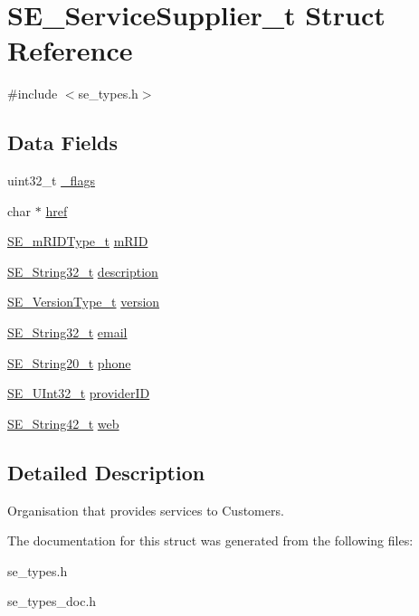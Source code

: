 \hypertarget{structSE__ServiceSupplier__t}{}\section{S\+E\+\_\+\+Service\+Supplier\+\_\+t Struct Reference}
\label{structSE__ServiceSupplier__t}


{\ttfamily \#include $<$se\+\_\+types.\+h$>$}

\subsection*{Data Fields}
\begin{DoxyCompactItemize}
\item 
uint32\+\_\+t \hyperlink{group__ServiceSupplier_ga41efbca82458bf466f86bba6e0781fee}{\+\_\+flags}
\item 
char $\ast$ \hyperlink{group__ServiceSupplier_gad5b711de34ee477aaa2daddc4577bfeb}{href}
\item 
\hyperlink{group__mRIDType_gac74622112f3a388a2851b2289963ba5e}{S\+E\+\_\+m\+R\+I\+D\+Type\+\_\+t} \hyperlink{group__ServiceSupplier_ga1b4fcb150a9e4ac2bf15c73fb0195c14}{m\+R\+ID}
\item 
\hyperlink{group__String32_gac9f59b06b168b4d2e0d45ed41699af42}{S\+E\+\_\+\+String32\+\_\+t} \hyperlink{group__ServiceSupplier_ga8f0635af29f2fcd2e10874b7fa194bb3}{description}
\item 
\hyperlink{group__VersionType_ga4b8d27838226948397ed99f67d46e2ae}{S\+E\+\_\+\+Version\+Type\+\_\+t} \hyperlink{group__ServiceSupplier_gaf772e85b2c6f57fa9adba209a9b6b998}{version}
\item 
\hyperlink{group__String32_gac9f59b06b168b4d2e0d45ed41699af42}{S\+E\+\_\+\+String32\+\_\+t} \hyperlink{group__ServiceSupplier_gaba52040aa146ecd82d50a3deb2d98c19}{email}
\item 
\hyperlink{group__String20_gac62354528eb48096f8deab6e503a3193}{S\+E\+\_\+\+String20\+\_\+t} \hyperlink{group__ServiceSupplier_ga182c6fbb5b90206fad482369e835961c}{phone}
\item 
\hyperlink{group__UInt32_ga70bd4ecda3c0c85d20779d685a270cdb}{S\+E\+\_\+\+U\+Int32\+\_\+t} \hyperlink{group__ServiceSupplier_ga0fbfa3eb24a6d2d0a652f44524327618}{provider\+ID}
\item 
\hyperlink{group__String42_gad5a294b994fa3a024ca6d747f784f0d9}{S\+E\+\_\+\+String42\+\_\+t} \hyperlink{group__ServiceSupplier_gae334c85b63bc5c156ed70d2d7359b0f0}{web}
\end{DoxyCompactItemize}


\subsection{Detailed Description}
Organisation that provides services to Customers. 

The documentation for this struct was generated from the following files\+:\begin{DoxyCompactItemize}
\item 
se\+\_\+types.\+h\item 
se\+\_\+types\+\_\+doc.\+h\end{DoxyCompactItemize}
